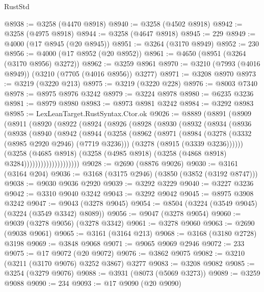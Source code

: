 \begin{lexlean}{RustStd}
\begin{coremodule}
@8938 := @3258 (@4470 @8918)
@8940 := @3258 (@4502 @8918)
@8942 := @3258 (@4975 @8918)
@8944 := @3258 (@4647 @8918)
@8945 := 229
@8949 := @4000 (@17 @8945 (@20 @8945))
@8951 := @3264 (@3170 @8949)
@8952 := 230
@8956 := @4000 (@17 @8952 (@20 @8952))
@8961 := @4650 (@8951 (@3264 (@3170 @8956) @3272))
@8962 := @3259 @8961
@8970 := @3210 (@7993 (@4016 @8949)) (@3210 (@7705 (@4016 @8956)) @3277)
@8971 := @3208 @8970
@8973 := @3219 (@3220 @213)
@8975 := @3219 (@3220 @228)
@8976 := @8003 @7340
@8978 := @8975 @8976 @3242
@8979 := @3224 @8978
@8980 := @6235 @3236
@8981 := @8979 @8980
@8983 := @8973 @8981 @3242
@8984 := @3292 @8983
@8985 := LexLeanTarget.RustSyntax.Ctor.ok
@9026 := @8889
    (@8891
      (@8909
        (@8911
          (@8920
            (@8922
              (@8924
                (@8926
                  (@8928
                    (@8930
                      (@8932
                        (@8934
                          (@8936
                            (@8938
                              (@8940
                                (@8942
                                  (@8944
                                    (@3258
                                      (@8962
                                        (@8971
                                          (@8984
                                            (@3278 (@3332 (@8985 @2920 @2946) (@7719 @3236)))
                                            (@3278 (@8915 (@3339 @3236))))))
                                      (@3258
                                        (@4685 @8918)
                                        (@3258
                                          (@4985 @8918)
                                          (@3258 (@4868 @8918) @3284))))))))))))))))))))
@9028 := @2690 (@8876 @9026)
@9030 := @3161 (@3164 @204)
@9036 := @3168 (@3175 @2946) (@3850 (@3852 (@3192 @8747)))
@9038 := @9030 @9036 @2920
@9039 := @3292 @3229
@9040 := @3227 @3236
@9042 := @3310 @9040 @3242
@9043 := @3292 @9042
@9045 := @8975 @3908 @3242
@9047 := @9043 (@3278 @9045)
@9054 := @8504 (@3224 (@3549 @9045) (@3224 (@3549 @3342) @8089))
@9056 := @9047 (@3278 @9054)
@9060 := @9039 (@3278 @9056) (@3278 @3342)
@9061 := @3278 @9060
@9063 := @2690 (@9038 @9061)
@9065 := @3161 (@3164 @213)
@9068 := @3168 (@3180 @2728) @3198
@9069 := @3848 @9068
@9071 := @9065 @9069 @2946
@9072 := 233
@9075 := @17 @9072 (@20 @9072)
@9076 := @3862 @9075
@9082 := @3210 (@3211 (@3170 @9076) @3252 @3867) @3277
@9083 := @3208 @9082
@9085 := @3254 (@3279 @9076)
@9088 := @3931 (@8073 (@5069 @3273))
@9089 := @3259 @9088
@9090 := 234
@9093 := @17 @9090 (@20 @9090)

\end{coremodule}
\end{lexlean}
